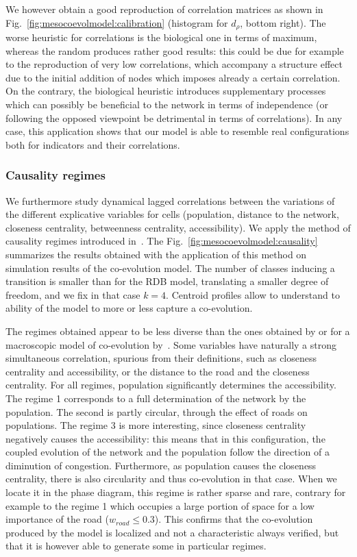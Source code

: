 We however obtain a good reproduction of correlation matrices as shown in Fig.~\ref{fig:mesocoevolmodel:calibration} (histogram for $d_{\rho}$, bottom right). The worse heuristic for correlations is the biological one in terms of maximum, whereas the random produces rather good results: this could be due for example to the reproduction of very low correlations, which accompany a structure effect due to the initial addition of nodes which imposes already a certain correlation. On the contrary, the biological heuristic introduces supplementary processes which can possibly be beneficial to the network in terms of independence (or following the opposed viewpoint be detrimental in terms of correlations). In any case, this application shows that our model is able to resemble real configurations both for indicators and their correlations.



\subsubsection{Causality regimes}


We furthermore study dynamical lagged correlations between the variations of the different explicative variables for cells (population, distance to the network, closeness centrality, betweenness centrality, accessibility). We apply the method of causality regimes introduced in~\cite{raimbault2017identification}. The Fig.~\ref{fig:mesocoevolmodel:causality} summarizes the results obtained with the application of this method on simulation results of the co-evolution model. The number of classes inducing a transition is smaller than for the RDB model, translating a smaller degree of freedom, and we fix in that case $k=4$. Centroid profiles allow to understand to ability of the model to more or less capture a co-evolution.



The regimes obtained appear to be less diverse than the ones obtained by \cite{raimbault2017identification} or for a macroscopic model of co-evolution by~\cite{2018arXiv180409430R}. Some variables have naturally a strong simultaneous correlation, spurious from their definitions, such as closeness centrality and accessibility, or the distance to the road and the closeness centrality. For all regimes, population significantly determines the accessibility. The regime 1 corresponds to a full determination of the network by the population. The second is partly circular, through the effect of roads on populations. The regime 3 is more interesting, since closeness centrality negatively causes the accessibility: this means that in this configuration, the coupled evolution of the network and the population follow the direction of a diminution of congestion. Furthermore, as population causes the closeness centrality, there is also circularity and thus co-evolution in that case. When we locate it in the phase diagram, this regime is rather sparse and rare, contrary for example to the regime 1 which occupies a large portion of space for a low importance of the road ($w_{road} \leq 0.3$). This confirms that the co-evolution produced by the model is localized and not a characteristic always verified, but that it is however able to generate some in particular regimes.


